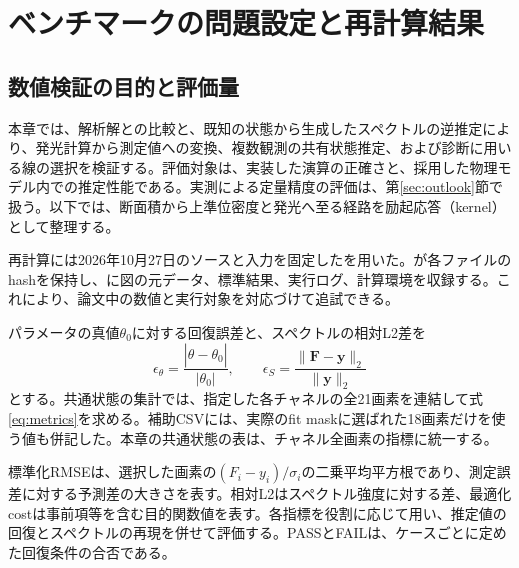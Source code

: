 \section{ベンチマークの問題設定と再計算結果}
\label{sec:benchmarks}
\subsection{数値検証の目的と評価量}
本章では、解析解との比較と、既知の状態から生成したスペクトルの逆推定により、発光計算から測定値への変換、複数観測の共有状態推定、および診断に用いる線の選択を検証する。評価対象は、実装した演算の正確さと、採用した物理モデル内での推定性能である。実測による定量精度の評価は、第\ref{sec:outlook}節で扱う。以下では、断面積から上準位密度と発光へ至る経路を励起応答（kernel）として整理する。

再計算には2026年10月27日のソースと入力を固定したを用いた。が各ファイルのhashを保持し、に図の元データ、標準結果、実行ログ、計算環境を収録する。これにより、論文中の数値と実行対象を対応づけて追試できる。

パラメータの真値$\theta_0$に対する回復誤差と、スペクトルの相対L2差を
\begin{equation}
\epsilon_\theta=\frac{|\widehat\theta-\theta_0|}{|\theta_0|},\qquad
\epsilon_S=\frac{\|\boldsymbol F-\boldsymbol y\|_2}{\|\boldsymbol y\|_2}
\label{eq:metrics}
\end{equation}
とする。共通状態の集計では、指定した各チャネルの全21画素を連結して式\eqref{eq:metrics}を求める。補助CSVには、実際のfit maskに選ばれた18画素だけを使う値も併記した。本章の共通状態の表は、チャネル全画素の指標に統一する。

標準化RMSEは、選択した画素の$(F_i-y_i)/\sigma_i$の二乗平均平方根であり、測定誤差に対する予測差の大きさを表す。相対L2はスペクトル強度に対する差、最適化costは事前項等を含む目的関数値を表す。各指標を役割に応じて用い、推定値の回復とスペクトルの再現を併せて評価する。PASSとFAILは、ケースごとに定めた回復条件の合否である。

